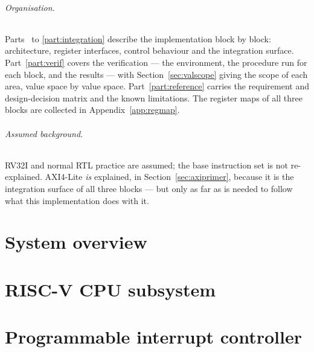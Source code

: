 \documentclass[11pt,openany]{report}
\begin{document}
\paragraph{Organisation.} Parts~\ref{part:cpu} to \ref{part:integration}
describe the implementation block by block: architecture, register interfaces,
control behaviour and the integration surface. Part~\ref{part:verif} covers the
verification --- the environment, the procedure run for each block, and the
results --- with Section~\ref{sec:valscope} giving the scope of each area, value
space by value space. Part~\ref{part:reference} carries the requirement and
design-decision matrix and the known limitations. The register maps of all three
blocks are collected in Appendix~\ref{app:regmap}.

\paragraph{Assumed background.} RV32I and normal RTL practice are assumed; the
base instruction set is not re-explained. AXI4-Lite \emph{is} explained, in
Section~\ref{sec:axiprimer}, because it is the integration surface of all three
blocks --- but only as far as is needed to follow what this implementation does
with it.

\tableofcontents
\listoffigures
\listoftables

\cleardoublepage
{}
\setcounter{page}{1}

\part{System overview}\label{part:system}


\part{RISC-V CPU subsystem}\label{part:cpu}






\part{Programmable interrupt controller}\label{part:pic}



\end{document}

